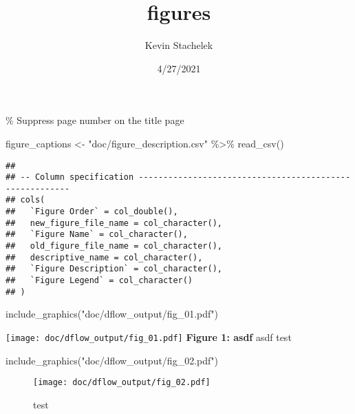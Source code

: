 \documentclass[
]{article}
\title{figures}
\author{Kevin Stachelek}
\date{4/27/2021}
\newenvironment{Shaded}{\begin{snugshade}}{\end{snugshade}}
\newcommand{\FunctionTok}[1]{\textcolor[rgb]{0.00,0.00,0.00}{#1}}
\newcommand{\NormalTok}[1]{#1}
\newcommand{\OtherTok}[1]{\textcolor[rgb]{0.56,0.35,0.01}{#1}}
\newcommand{\SpecialCharTok}[1]{\textcolor[rgb]{0.00,0.00,0.00}{#1}}
\newcommand{\StringTok}[1]{\textcolor[rgb]{0.31,0.60,0.02}{#1}}
\begin{document}
\maketitle

 \% Suppress page number on the title page

\begin{Shaded}
\end{Shaded}

\begin{Shaded}
\begin{Highlighting}[]
\NormalTok{figure\_captions }\OtherTok{\textless{}{-}} \StringTok{"doc/figure\_description.csv"} \SpecialCharTok{\%\textgreater{}\%} 
    \FunctionTok{read\_csv}\NormalTok{()}
\end{Highlighting}
\end{Shaded}

\begin{verbatim}
## 
## -- Column specification --------------------------------------------------------
## cols(
##   `Figure Order` = col_double(),
##   new_figure_file_name = col_character(),
##   `Figure Name` = col_character(),
##   old_figure_file_name = col_character(),
##   descriptive_name = col_character(),
##   `Figure Description` = col_character(),
##   `Figure Legend` = col_character()
## )
\end{verbatim}

\begin{Shaded}
\begin{Highlighting}[]
\FunctionTok{include\_graphics}\NormalTok{(}\StringTok{"doc/dflow\_output/fig\_01.pdf"}\NormalTok{)}
\end{Highlighting}
\end{Shaded}

\texttt{[image: doc/dflow\_output/fig\_01.pdf]} \textbf{Figure 1: asdf}
asdf test \newpage

\begin{Shaded}
\begin{Highlighting}[]
\FunctionTok{include\_graphics}\NormalTok{(}\StringTok{"doc/dflow\_output/fig\_02.pdf"}\NormalTok{)}
\end{Highlighting}
\end{Shaded}

\begin{figure}
\centering
\texttt{[image: doc/dflow\_output/fig\_02.pdf]}
\caption{test}
\end{figure}
\end{document}
